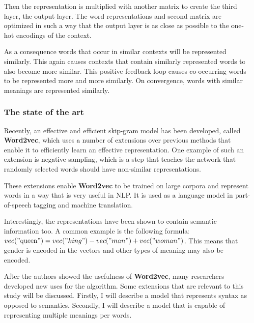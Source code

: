 \documentclass{article}
\begin{document}
 Then the representation is multiplied with another matrix to create the third layer, the output layer. The word representations and second matrix are optimized in such a way that the output layer is as close as possible to the one-hot encodings of the context.
 
 As a consequence words that occur in similar contexts will be represented similarly. This again causes contexts that contain similarly represented words to also become more similar. This positive feedback loop causes co-occurring words to be represented more and more similarly. On convergence, words with similar meanings are represented similarly.

 \subsubsection{The state of the art}
 Recently, an effective and efficient skip-gram model has been developed, called \textbf{Word2vec}, which uses a number of extensions over previous methods that enable it to efficiently learn an effective representation\cite{w2v}. One example of such an extension is negative sampling, which is a step that teaches the network that randomly selected words should have non-similar representations.
 
 These extensions enable \textbf{Word2vec} to be trained on large corpora and represent words in a way that is very useful in NLP. It is used as a language model in part-of-speech tagging and machine translation.
 
 Interestingly, the representations have been shown to contain semantic information too. A common example is the following formula: $vec("\text{queen}") = vec("king") - vec("man") + vec("woman")$. This means that gender is encoded in the vectors and other types of meaning may also be encoded.
 
 After the authors showed the usefulness of \textbf{Word2vec}, many researchers developed new uses for the algorithm. Some extensions that are relevant to this study will be discussed. Firstly, I will describe a model that represents syntax as opposed to semantics. Secondly, I will describe a model that is capable of representing multiple meanings per words.
 
\end{document}
